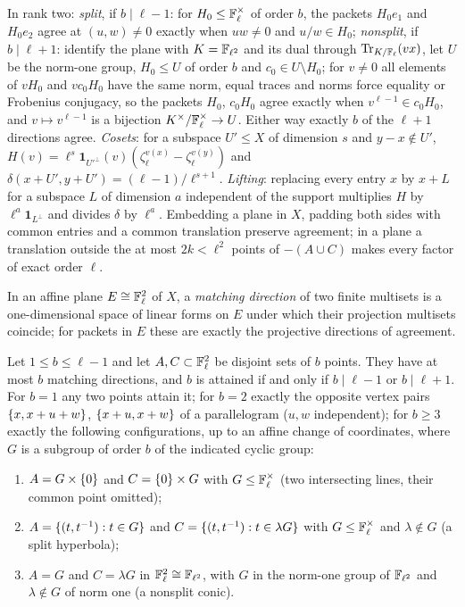 \begin{construction}\label{rec:con:opack}
In rank two:
\emph{split}, if $b\mid\ell-1$: for $H_0\le\mathbb{F}_\ell^\times$ of order $b$, the packets $H_0e_1$ and $H_0e_2$ agree at $(u,w)\ne0$
exactly when $uw\ne0$ and $u/w\in H_0$;
\emph{nonsplit}, if $b\mid\ell+1$: identify the plane with $K=\mathbb{F}_{\ell^2}$ and its dual through $\operatorname{Tr}_{K/\mathbb{F}_\ell}(vx)$, let $U$ be the
norm-one group, $H_0\le U$ of order $b$ and $c_0\in U\setminus H_0$; for $v\ne0$ all elements of $vH_0$ and $vc_0H_0$ have the same norm,
equal traces and norms force equality or Frobenius conjugacy, so the packets $H_0$, $c_0H_0$ agree exactly
when $v^{\ell-1}\in c_0H_0$, and $v\mapsto v^{\ell-1}$ is a bijection $K^\times/\mathbb{F}_\ell^\times\to U$.
Either way exactly $b$ of the $\ell+1$ directions agree. \emph{Cosets}: for a subspace $U'\le X$ of dimension $s$ and
$y-x\notin U'$, $H(v)=\ell^s\mathbf 1_{U'^\perp}(v)(\zeta_\ell^{v(x)}-\zeta_\ell^{v(y)})$ and $\delta(x+U',y+U')=(\ell-1)/\ell^{s+1}$. \emph{Lifting}: replacing every
entry $x$ by $x+L$ for a subspace $L$ of dimension $a$ independent of the support multiplies $H$ by
$\ell^a\mathbf 1_{L^\perp}$ and divides $\delta$ by $\ell^a$. Embedding a plane in $X$, padding both sides with common entries and a
common translation preserve agreement; in a plane a translation outside the at most $2k<\ell^2$ points of
$-(A\cup C)$ makes every factor of exact order $\ell$.
\end{construction}

In an affine plane $E\cong\mathbb{F}_\ell^2$ of $X$, a \emph{matching direction} of two finite multisets is a
one-dimensional space of linear forms on $E$ under which their projection multisets coincide; for
packets in $E$ these are exactly the projective directions of agreement.

\begin{theorem}\label{rec:thm:oplanar}
Let $1\le b\le\ell-1$ and let $A,C\subset\mathbb{F}_\ell^2$ be disjoint sets of $b$ points. They have at most $b$ matching
directions, and $b$ is attained if and only if $b\mid\ell-1$ or $b\mid\ell+1$. For $b=1$ any two points attain
it; for $b=2$ exactly the opposite vertex pairs $\{x,x+u+w\}$, $\{x+u,x+w\}$ of a parallelogram ($u,w$
independent); for $b\ge3$ exactly the following configurations, up to an affine change of coordinates,
where $G$ is a subgroup of order $b$ of the indicated cyclic group:
\begin{enumerate}
\item $A=G\times\{0\}$ and $C=\{0\}\times G$ with $G\le\mathbb{F}_\ell^\times$ (two intersecting lines, their common point omitted);
\item $A=\{(t,t^{-1}):t\in G\}$ and $C=\{(t,t^{-1}):t\in\lambda G\}$ with $G\le\mathbb{F}_\ell^\times$ and $\lambda\notin G$ (a split hyperbola);
\item $A=G$ and $C=\lambda G$ in $\mathbb{F}_\ell^2\cong\mathbb{F}_{\ell^2}$, with $G$ in the norm-one group of $\mathbb{F}_{\ell^2}$ and $\lambda\notin G$ of norm one
 (a nonsplit conic).
\end{enumerate}
\end{theorem}

